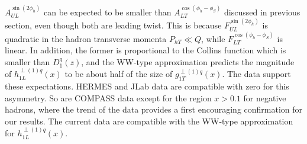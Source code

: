 \documentclass[a4paper,11pt]{article}
\begin{document}
$A_{UL}^{\sin(2\phi_h)}$  can be expected to be smaller than 
$A_{LT}^{\cos(\phi_h -\phi_S)}$ discussed in previous section,
even though both are leading twist. This is because 
$F_{UL}^{\sin(2\phi_h)}$ is quadratic in the hadron transverse 
momenta $P_{hT}\ll Q$, while $F_{LT}^{\cos(\phi_h -\phi_S)}$ is linear. 
In addition, the former is proportional to the Collins function 
which is smaller than $D_1^q(z)$, and the WW-type approximation 
predicts the magnitude of $h_{1L}^{\perp(1)q}(x)$ to be about half 
of the size of $g_{1T}^{\perp(1)q}(x)$.
The data support these expectations. HERMES and JLab data are compatible
with zero for this asymmetry. So are COMPASS data except for the region
$x>0.1$ for negative hadrons, where the trend of the data provides a first 
encouraging confirmation for our results. The current data are compatible
with the WW-type approximation for $h_{1L}^{\perp(1)q}(x)$. 




\newpage
\end{document}
